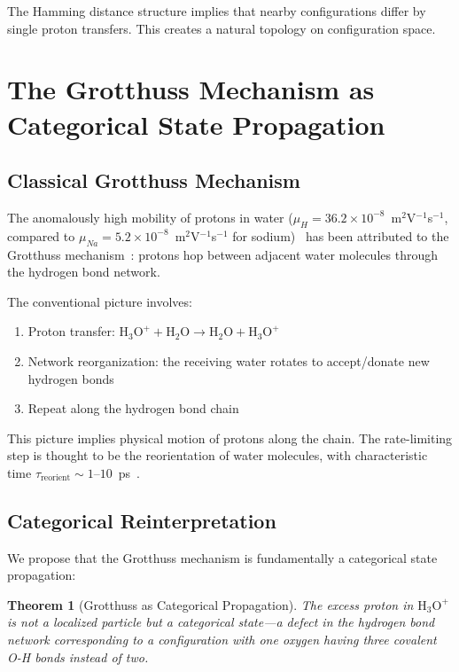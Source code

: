 \documentclass[twocolumn,showpacs,preprintnumbers,amsmath,amssymb,prd]{revtex4-2}
\newtheorem{theorem}{Theorem}[section]
\begin{document}
The Hamming distance structure implies that nearby configurations differ by single proton transfers. This creates a natural topology on configuration space.


\section{The Grotthuss Mechanism as Categorical State Propagation}
\label{sec:grotthuss}

\subsection{Classical Grotthuss Mechanism}

The anomalously high mobility of protons in water ($\mu_H = 36.2 \times 10^{-8}$~m$^2$V$^{-1}$s$^{-1}$, compared to $\mu_{Na} = 5.2 \times 10^{-8}$~m$^2$V$^{-1}$s$^{-1}$ for sodium)~\cite{Atkins2014} has been attributed to the Grotthuss mechanism~\cite{Grotthuss1806}: protons hop between adjacent water molecules through the hydrogen bond network.

The conventional picture involves:
\begin{enumerate}
\item Proton transfer: $\text{H}_3\text{O}^+ + \text{H}_2\text{O} \to \text{H}_2\text{O} + \text{H}_3\text{O}^+$
\item Network reorganization: the receiving water rotates to accept/donate new hydrogen bonds
\item Repeat along the hydrogen bond chain
\end{enumerate}

This picture implies physical motion of protons along the chain. The rate-limiting step is thought to be the reorientation of water molecules, with characteristic time $\tau_{\text{reorient}} \sim 1$--$10$~ps~\cite{Laage2006}.

\subsection{Categorical Reinterpretation}

We propose that the Grotthuss mechanism is fundamentally a categorical state propagation:

\begin{theorem}[Grotthuss as Categorical Propagation]
\label{thm:grotthuss}
The excess proton in $\text{H}_3\text{O}^+$ is not a localized particle but a categorical state---a defect in the hydrogen bond network corresponding to a configuration with one oxygen having three covalent O-H bonds instead of two.
\end{theorem}
\end{document}
